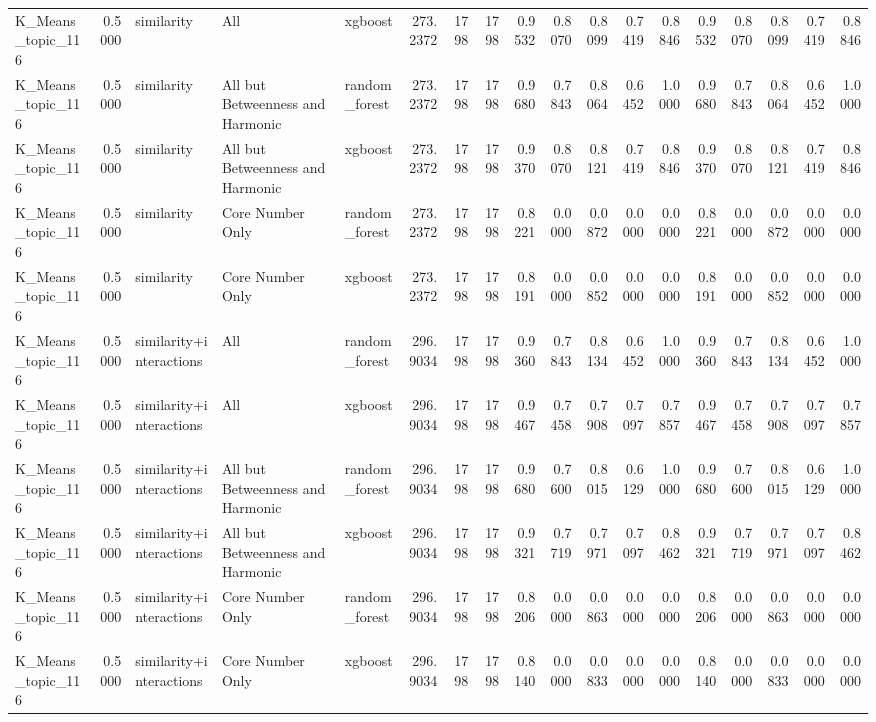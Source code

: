 \begin{tabular}{lrlllrrrrrrrrrrrrr}
K_Means_topic_116 & 0.5000 & similarity & All & xgboost & 273.2372 & 1798 & 1798 & 0.9532 & 0.8070 & 0.8099 & 0.7419 & 0.8846 & 0.9532 & 0.8070 & 0.8099 & 0.7419 & 0.8846 \\
K_Means_topic_116 & 0.5000 & similarity & All but Betweenness and Harmonic & random_forest & 273.2372 & 1798 & 1798 & 0.9680 & 0.7843 & 0.8064 & 0.6452 & 1.0000 & 0.9680 & 0.7843 & 0.8064 & 0.6452 & 1.0000 \\
K_Means_topic_116 & 0.5000 & similarity & All but Betweenness and Harmonic & xgboost & 273.2372 & 1798 & 1798 & 0.9370 & 0.8070 & 0.8121 & 0.7419 & 0.8846 & 0.9370 & 0.8070 & 0.8121 & 0.7419 & 0.8846 \\
K_Means_topic_116 & 0.5000 & similarity & Core Number Only & random_forest & 273.2372 & 1798 & 1798 & 0.8221 & 0.0000 & 0.0872 & 0.0000 & 0.0000 & 0.8221 & 0.0000 & 0.0872 & 0.0000 & 0.0000 \\
K_Means_topic_116 & 0.5000 & similarity & Core Number Only & xgboost & 273.2372 & 1798 & 1798 & 0.8191 & 0.0000 & 0.0852 & 0.0000 & 0.0000 & 0.8191 & 0.0000 & 0.0852 & 0.0000 & 0.0000 \\
K_Means_topic_116 & 0.5000 & similarity+interactions & All & random_forest & 296.9034 & 1798 & 1798 & 0.9360 & 0.7843 & 0.8134 & 0.6452 & 1.0000 & 0.9360 & 0.7843 & 0.8134 & 0.6452 & 1.0000 \\
K_Means_topic_116 & 0.5000 & similarity+interactions & All & xgboost & 296.9034 & 1798 & 1798 & 0.9467 & 0.7458 & 0.7908 & 0.7097 & 0.7857 & 0.9467 & 0.7458 & 0.7908 & 0.7097 & 0.7857 \\
K_Means_topic_116 & 0.5000 & similarity+interactions & All but Betweenness and Harmonic & random_forest & 296.9034 & 1798 & 1798 & 0.9680 & 0.7600 & 0.8015 & 0.6129 & 1.0000 & 0.9680 & 0.7600 & 0.8015 & 0.6129 & 1.0000 \\
K_Means_topic_116 & 0.5000 & similarity+interactions & All but Betweenness and Harmonic & xgboost & 296.9034 & 1798 & 1798 & 0.9321 & 0.7719 & 0.7971 & 0.7097 & 0.8462 & 0.9321 & 0.7719 & 0.7971 & 0.7097 & 0.8462 \\
K_Means_topic_116 & 0.5000 & similarity+interactions & Core Number Only & random_forest & 296.9034 & 1798 & 1798 & 0.8206 & 0.0000 & 0.0863 & 0.0000 & 0.0000 & 0.8206 & 0.0000 & 0.0863 & 0.0000 & 0.0000 \\
K_Means_topic_116 & 0.5000 & similarity+interactions & Core Number Only & xgboost & 296.9034 & 1798 & 1798 & 0.8140 & 0.0000 & 0.0833 & 0.0000 & 0.0000 & 0.8140 & 0.0000 & 0.0833 & 0.0000 & 0.0000 \\

\end{tabular}
